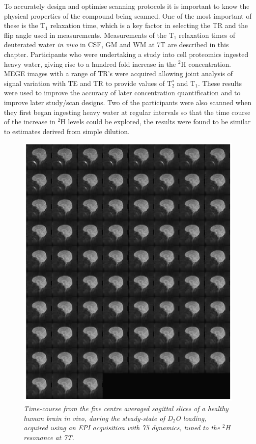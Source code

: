 To accurately design and optimise scanning protocols it is important to know the physical properties of the compound being scanned. One of the most important of these is the T$_1$ relaxation time, which is a key factor in selecting the \ac{TR} and the flip angle used in measurements. Measurements of the T$_1$ relaxation times of deuterated water \textit{in vivo} in \ac{CSF}, \ac{GM} and \ac{WM} at 7T are described in this chapter. Participants who were undertaking a study into cell proteomics ingested heavy water, giving rise to a hundred fold increase in the $^2$H concentration. \ac{MEGE} images with a range of \ac{TR}'s were acquired allowing joint analysis of signal variation with \ac{TE} and \ac{TR} to provide values of T$_2^*$ and T$_1$. These results were used to improve the accuracy of later concentration quantification and to improve later study/scan designs. Two of the participants were also scanned when they first began ingesting heavy water at regular intervals so that the time course of the increase in $^2$H levels could be explored, the results were found to be similar to estimates derived from simple dilution.

\begin{figure}[H]
    \centering
    \includegraphics[width=1\textwidth]{Figures/D2O/EPI.png}
    \caption{\textit{Time-course from the five centre averaged sagittal slices of a healthy human brain in vivo, during the steady-state of D$_2$O loading, acquired using an \ac{EPI} acquisition with 75 dynamics, tuned to the $^2$H resonance at 7T.}}
    \label{fig:Conc:EPI}
\end{figure}

